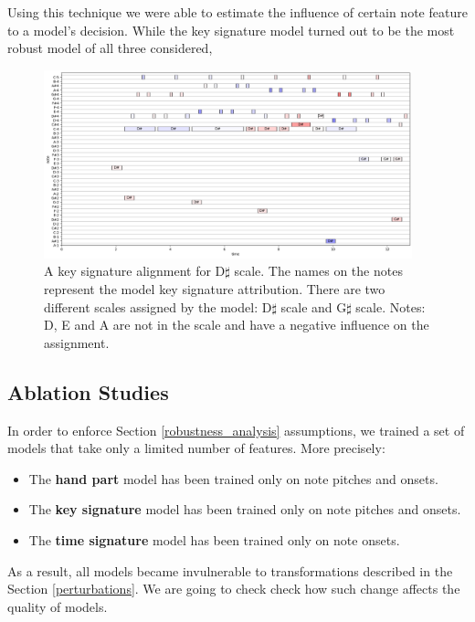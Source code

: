 Using this technique we were able to estimate the influence of certain note feature to a model's decision. While the key signature model turned out to be the most robust model of all three considered, 

\begin{figure}[!ht]
\centering
\includegraphics[width=0.95\textwidth]{images/note_removing.png}
\caption[A key signature alignment for D$\sharp$ scale]{A key signature alignment for D$\sharp$ scale. The names on the notes represent the model key signature attribution. There are two different scales assigned by the model: D$\sharp$ scale and G$\sharp$ scale. Notes: D, E and A are not in the scale and have a negative influence on the assignment.}
\label{note_removing}\end{figure}

\subsection{Ablation Studies} \label{ablation_studies}

In order to enforce Section \ref{robustness_analysis} assumptions, we trained a set of models that take only a limited number of features. More precisely: \begin{itemize}
	\item The \textbf{hand part} model has been trained only on note pitches and onsets.
	\item The \textbf{key signature} model has been trained only on note pitches and onsets.
	\item The \textbf{time signature} model has been trained only on note onsets.
\end{itemize}

As a result, all models became invulnerable to transformations described in the Section \ref{perturbations}. We are going to check check how such change affects the quality of models. 

